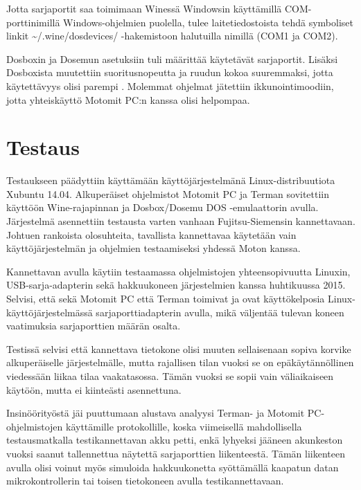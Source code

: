 \documentclass[11pt,a4paper,oneside,article]{memoir}
\begin{document}
Jotta sarjaportit saa toimimaan Winessä Windowsin käyttämillä COM-porttinimillä Windows-ohjelmien puolella, tulee laitetiedostoista tehdä symboliset linkit \textasciitilde{}/.wine/dosdevices/ -hakemistoon halutuilla nimillä (COM1 ja COM2).\cite[s. 21]{wine:manual}

Dosboxin ja Dosemun asetuksiin tuli määrittää käytetävät sarjaportit. Lisäksi Dosboxista muutettiin suoritusnopeutta ja ruudun kokoa suuremmaksi, jotta käytettävyys olisi parempi \cite{dosbox:conf}. Molemmat ohjelmat jätettiin ikkunointimoodiin, jotta yhteiskäyttö Motomit PC:n kanssa olisi helpompaa.

\section{Testaus}

Testaukseen päädyttiin käyttämään käyttöjärjestelmänä Linux-distribuutiota Xubuntu 14.04. Alkuperäiset ohjelmistot Motomit PC ja Terman sovitettiin käyttöön Wine-rajapinnan ja Dosbox/Dosemu DOS -emulaattorin avulla. Järjestelmä asennettiin testausta varten vanhaan Fujitsu-Siemensin kannettavaan. Johtuen rankoista olosuhteita, tavallista kannettavaa käytetään vain käyttöjärjestelmän ja ohjelmien testaamiseksi yhdessä Moton kanssa.

Kannettavan avulla käytiin testaamassa ohjelmistojen yhteensopivuutta Linuxin, USB-sarja-adapterin sekä hakkuukoneen järjestelmien kanssa huhtikuussa 2015. Selvisi, että sekä Motomit PC että Terman toimivat ja ovat käyttökelposia Linux-käyttöjärjestelmässä sarjaporttiadapterin avulla, mikä väljentää tulevan koneen vaatimuksia sarjaporttien määrän osalta.

Testissä selvisi että kannettava tietokone olisi muuten sellaisenaan sopiva korvike alkuperäiselle järjestelmälle, mutta rajallisen tilan vuoksi se on epäkäytännöllinen viedessään liikaa tilaa vaakatasossa. Tämän vuoksi se sopii vain väliaikaiseen käytöön, mutta ei kiinteästi asennettuna.

Insinöörityöstä jäi puuttumaan alustava analyysi Terman- ja Motomit PC-ohjelmistojen käyttämille protokollille, koska viimeisellä mahdollisella testausmatkalla testikannettavan akku petti, enkä lyhyeksi jääneen akunkeston vuoksi saanut tallennettua näytettä sarjaporttien liikenteestä. Tämän liikenteen avulla olisi voinut myös simuloida hakkuukonetta syöttämällä kaapatun datan mikrokontrollerin tai toisen tietokoneen avulla testikannettavaan.\newline
\end{document}
